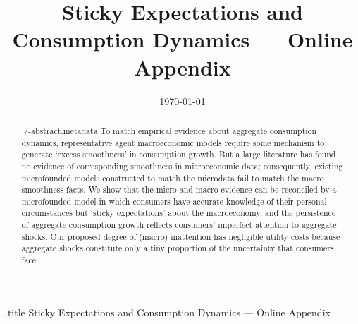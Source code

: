 \documentclass[titlepage]{\econtex}
\begin{document}

	
	
	
	\begin{verbatimwrite}{\jobname.title}
		Sticky Expectations and Consumption Dynamics --- Online Appendix
	\end{verbatimwrite}
	
	\hfill{\tiny \jobname}
	
	\title{Sticky Expectations and Consumption Dynamics --- Online Appendix}
	
	
	
	
	\date{\today}
	\maketitle
	
	\hypertarget{Abstract}{}
	\begin{abstract}
		\begin{verbatimwrite}{./\jobname-abstract.metadata}
			To match empirical evidence about aggregate consumption dynamics, representative agent macroeconomic models require some mechanism to generate `excess smoothness' in consumption growth.   But a large literature has found no evidence of corresponding smoothness in microeconomic data; consequently, existing microfounded models constructed to match the microdata fail to match the macro smoothness facts.  We show that the micro and macro evidence can be reconciled by a microfounded model in which consumers have accurate knowledge of their personal circumstances but `sticky expectations' about the macroeconomy, and the persistence of aggregate consumption growth reflects consumers' imperfect attention to aggregate shocks. Our proposed degree of (macro) inattention has negligible utility costs because aggregate shocks constitute only a tiny proportion of the uncertainty that consumers face.%
		\end{verbatimwrite}
		
	\end{abstract}
	
\end{document}
